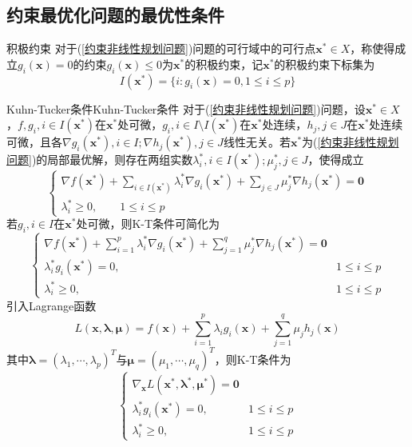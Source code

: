 \documentclass[lang = cn, scheme = chinese, thmcnt = section]{elegantbook}
\newcommand{\bs}{\boldsymbol}          %
\begin{document}
\subsection{约束最优化问题的最优性条件}

\begin{definition}{积极约束}
	对于(\ref{约束非线性规划问题})问题的可行域中的可行点$\bs{x}^*\in X$，称使得成立$g_i(\bs{x})=0$的约束$g_i(\bs{x})\le 0$为$\bs{x}^*$的积极约束，记$\bs{x}^*$的积极约束下标集为
	$$
	I(\bs{x}^*)=\{ i:g_i(\bs{x})=0, 1\le i \le p\}
	$$
\end{definition}

\begin{theorem}{Kuhn-Tucker条件}{Kuhn-Tucker条件}
	对于(\ref{约束非线性规划问题})问题，设$\bs{x}^*\in X$，$f,g_i,i\in I(\bs{x}^*)$在$\bs{x}^*$处可微，$g_i,i\in I\setminus I(\bs{x}^*)$在$\bs{x}^*$处连续，$h_j,j\in J$在$\bs{x}^*$处连续可微，且各$\nabla g_i(\bs{x}^*),i\in I;\nabla h_j(\bs{x}^*),j\in J$线性无关。若$\bs{x}^*$为(\ref{约束非线性规划问题})的局部最优解，则存在两组实数$\lambda_i^*,i\in I(\bs{x}^*);\mu_j^*,j\in J$，使得成立
	$$
	\begin{cases}
		\displaystyle \nabla f(\bs{x}^*)+\sum_{i\in I(\bs{x}^*)}\lambda_i^*\nabla g_i(\bs{x}^*)+\sum_{j\in J}\mu_j^*\nabla h_j(\bs{x}^*)=\bs{0}\\
		\lambda_i^*\ge 0,\qquad 1\le i \le p
	\end{cases}
	$$
	若$g_i,i\in I$在$\bs{x}^*$处可微，则K-T条件可简化为
	$$
	\begin{cases}
		\displaystyle \nabla f(\bs{x}^*)+\sum_{i=1}^{p}\lambda_i^*\nabla g_i(\bs{x}^*)+\sum_{j=1}^{q}\mu_j^*\nabla h_j(\bs{x}^*)=\bs{0}\\
		\displaystyle \lambda_i^*g_i(\bs{x}^*)=0,\qquad & 1\le i \le p\\
		\lambda_i^*\ge 0,\qquad & 1\le i \le p
	\end{cases}
	$$
	引入Lagrange函数
	$$
	L(\bs{x},\bs{\lambda},\bs{\mu})=f(\bs{x})+\sum_{i=1}^{p}\lambda_i g_i(\bs{x})+\sum_{j=1}^{q}\mu_j h_j(\bs{x})
	$$
	其中$\bs{\lambda}=(\lambda_1,\cdots,\lambda_p)^T$与$\bs{\mu}=(\mu_1,\cdots,\mu_q)^T$，则K-T条件为
	$$
	\begin{cases}
		\nabla_{\bs{x}}L(\bs{x}^*,\bs{\lambda}^*,\bs{\mu}^*)=\bs{0}\\
		\lambda_i^*g_i(\bs{x}^*)=0,\qquad & 1\le i \le p\\
		\lambda_i^*\ge 0,\qquad & 1\le i \le p
	\end{cases}
	$$
\end{theorem}
\end{document}
